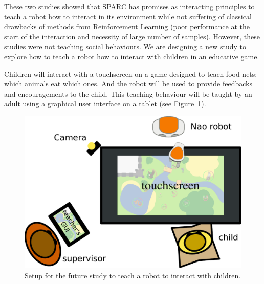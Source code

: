 \documentclass[conference]{IEEEtran}
\begin{document}
These two studies showed that SPARC has promises as interacting principles to
teach a robot how to interact in its environment while not suffering of
classical drawbacks of methods from Reinforcement Learning (poor performance at
the start of the interaction and necessity of large number of samples). However,
these studies were not teaching social behaviours. We are designing a new study
to explore how to teach a robot how to interact with children in an educative
game. 

Children will interact with a touchscreen on a game designed to teach food nets:
which animals eat which ones. And the robot will be used to provide feedbacks
and encouragements to the child. This teaching behaviour will be taught by an
adult using a graphical user interface on a tablet (see Figure~\ref{fig:setup}).

\begin{figure}
    \centering
    \includegraphics[width=0.9\linewidth]{setup.pdf}
    \caption{Setup for the future study to teach a robot to interact with
    children.}
    \label{fig:setup}
\end{figure}






 
\end{document}
